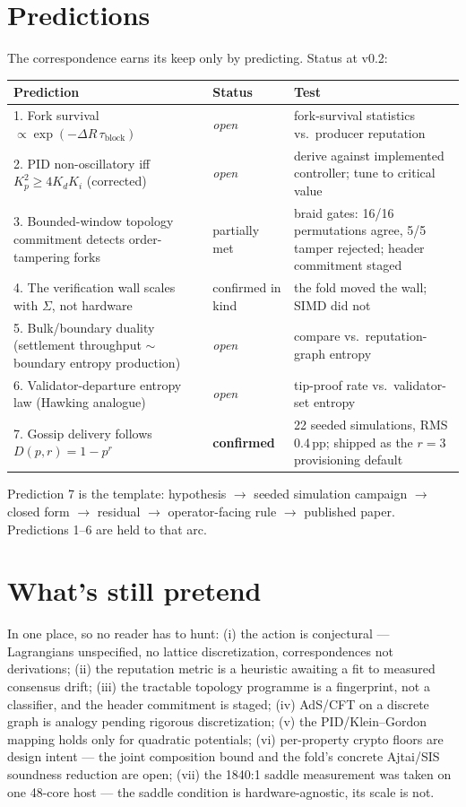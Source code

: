 \documentclass[10pt,a4paper]{article}
\newcommand{\pretend}[1]{\textcolor{sigilgold}{\textit{#1}}}
\begin{document}
\section{Predictions}

The correspondence earns its keep only by predicting. Status at v0.2:

\begin{center}
\small
\begin{tabular}{@{}p{7.2cm}lp{5.2cm}@{}}
\toprule
Prediction & Status & Test \\
\midrule
1. Fork survival $\propto \exp(-\Delta R\,\tau_{\mathrm{block}})$ & \pretend{open} &
fork-survival statistics vs.\ producer reputation \\
2. PID non-oscillatory iff $K_p^2 \ge 4K_dK_i$ (corrected) & \pretend{open} & derive
against implemented controller; tune to critical value \\
3. Bounded-window topology commitment detects order-tampering forks &
partially met & braid gates: 16/16 permutations agree, 5/5 tamper rejected; header
commitment staged \\
4. The verification wall scales with $\Sigma$, not hardware & confirmed in kind & the
fold moved the wall; SIMD did not \\
5. Bulk/boundary duality (settlement throughput $\sim$ boundary entropy production) &
\pretend{open} & compare vs.\ reputation-graph entropy \\
6. Validator-departure entropy law (Hawking analogue) & \pretend{open} & tip-proof rate
vs.\ validator-set entropy \\
7. Gossip delivery follows $D(p,r)=1-p^r$ & \textbf{confirmed} & 22 seeded simulations,
RMS 0.4\,pp; shipped as the $r{=}3$ provisioning default \\
\bottomrule
\end{tabular}
\end{center}

Prediction 7 is the template: hypothesis $\to$ seeded simulation campaign $\to$ closed
form $\to$ residual $\to$ operator-facing rule $\to$ published paper. Predictions 1--6
are held to that arc.

\section{What's still pretend}

In one place, so no reader has to hunt: (i) the action is conjectural — Lagrangians
unspecified, no lattice discretization, correspondences not derivations; (ii) the
reputation metric is a heuristic awaiting a fit to measured consensus drift; (iii) the
tractable topology programme is a fingerprint, not a classifier, and the header
commitment is staged; (iv) AdS/CFT on a discrete graph is analogy pending rigorous
discretization; (v) the PID/Klein--Gordon mapping holds only for quadratic potentials;
(vi) per-property crypto floors are design intent — the joint composition bound and the
fold's concrete Ajtai/SIS soundness reduction are open; (vii) the 1840:1 saddle
measurement was taken on one 48-core host — the saddle condition is hardware-agnostic,
its scale is not.
\end{document}
